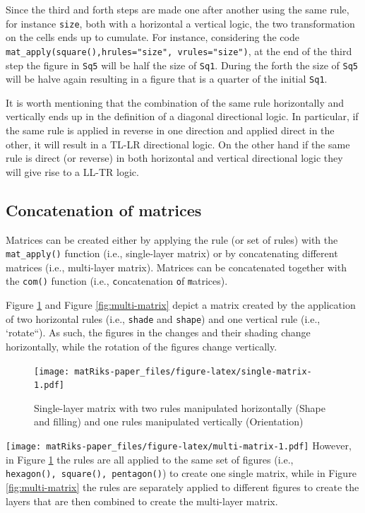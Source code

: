 Since the third and forth steps are made one after another using the same rule, for instance \texttt{size}, both with a horizontal a vertical logic, the two transformation on the cells ends up to cumulate.
For instance, considering the code \texttt{mat\_apply(square(),hrules="size",\ vrules="size")}, at the end of the third step the figure in \texttt{Sq5} will be half the size of \texttt{Sq1}.
During the forth the size of \texttt{Sq5} will be halve again resulting in a figure that is a quarter of the initial \texttt{Sq1}.

It is worth mentioning that the combination of the same rule horizontally and vertically ends up in the definition of a diagonal directional logic.
In particular, if the same rule is applied in reverse in one direction and applied direct in the other, it will result in a TL-LR directional logic.
On the other hand if the same rule is direct (or reverse) in both horizontal and vertical directional logic they
will give rise to a LL-TR logic.

\subsection{Concatenation of matrices}\label{concatenation-of-matrices}

Matrices can be created either by applying the rule (or set of rules) with the \texttt{mat\_apply()} function (i.e., single-layer matrix) or by concatenating different matrices (i.e., multi-layer matrix). Matrices can be concatenated together with the \texttt{com()} function (i.e., \texttt{c}oncatenation \texttt{o}f \texttt{m}atrices).

Figure \ref{fig:single-matrix} and Figure \ref{fig:multi-matrix} depict a matrix created by the application of two horizontal rules (i.e., \texttt{shade} and \texttt{shape}) and one vertical rule (i.e., `rotate``). As such, the figures in the changes and their shading change horizontally, while the rotation of the figures change vertically.

\begin{figure}
\centering
\texttt{[image: matRiks-paper\_files/figure-latex/single-matrix-1.pdf]}
\caption{\label{fig:single-matrix}Single-layer matrix with two rules manipulated horizontally (Shape and filling) and one rules manipulated vertically (Orientation)}
\end{figure}

\texttt{[image: matRiks-paper\_files/figure-latex/multi-matrix-1.pdf]}
However, in Figure \ref{fig:single-matrix} the rules are all applied to the same set of figures (i.e., \texttt{hexagon(),\ square(),\ pentagon()}) to create one single matrix, while in Figure \ref{fig:multi-matrix} the rules are separately applied to different figures to create the layers that are then combined to create the multi-layer matrix.


